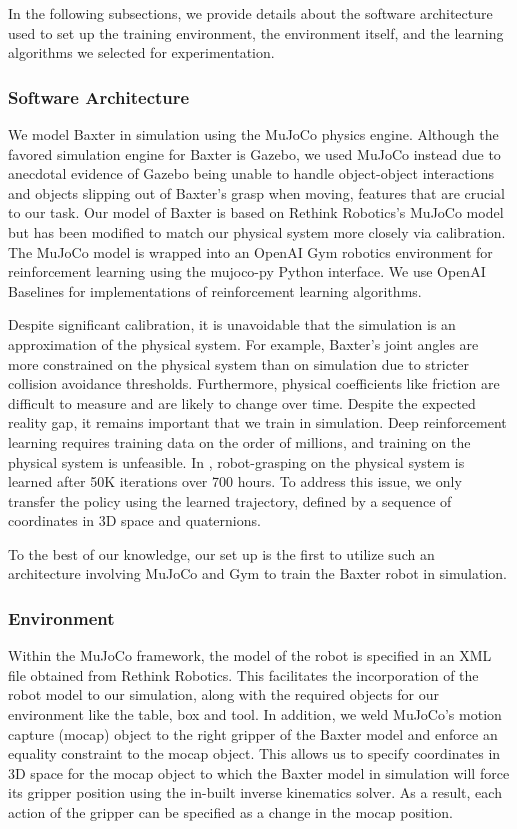 \documentclass[conference]{IEEEtran}
\begin{document}
In the following subsections, we provide details about the software architecture used to set up the training environment, the environment itself, and the learning algorithms we selected for experimentation.

\vspace{2mm}
\subsubsection{Software Architecture}
We model Baxter in simulation using the MuJoCo physics engine\cite{b7}. Although the favored simulation engine for Baxter is Gazebo, we used MuJoCo instead due to anecdotal evidence of Gazebo being unable to handle object-object interactions and objects slipping out of Baxter's grasp when moving, features that are crucial to our task. Our model of Baxter is based on Rethink Robotics's MuJoCo model but has been modified to match our physical system more closely via calibration. The MuJoCo model is wrapped into an OpenAI Gym\cite{b8} robotics environment for reinforcement learning using the mujoco-py Python interface. We use OpenAI Baselines\cite{b9} for implementations of reinforcement learning algorithms.

Despite significant calibration, it is unavoidable that the simulation is an approximation of the physical system. For example, Baxter's joint angles are more constrained on the physical system than on simulation due to stricter collision avoidance thresholds. Furthermore, physical coefficients like friction are difficult to measure and are likely to change over time. Despite the expected reality gap, it remains important that we train in simulation. Deep reinforcement learning requires training data on the order of millions, and training on the physical system is unfeasible. In \cite{b4}, robot-grasping on the physical system is learned after 50K iterations over 700 hours. To address this issue, we only transfer the policy using the learned trajectory, defined by a sequence of coordinates in 3D space and quaternions. 

To the best of our knowledge, our set up is the first to utilize such an architecture involving MuJoCo and Gym to train the Baxter robot in simulation. 

\vspace{2mm}
\subsubsection{Environment}
Within the MuJoCo framework, the model of the robot is specified in an XML file obtained from Rethink Robotics\cite{b10}. This facilitates the incorporation of the robot model to our simulation, along with the required objects for our environment like the table, box and tool. In addition, we weld MuJoCo's motion capture (mocap) object to the right gripper of the Baxter model and enforce an equality constraint to the mocap object. This allows us to specify coordinates in 3D space for the mocap object to which the Baxter model in simulation will force its gripper position using the in-built inverse kinematics solver. As a result, each action of the gripper can be specified as a change in the mocap position.
\end{document}
